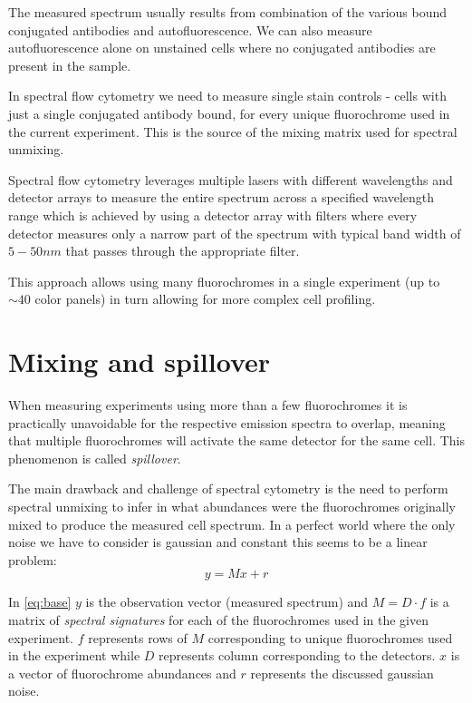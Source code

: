 The measured spectrum usually results from combination of the various bound conjugated antibodies and autofluorescence. We can also measure autofluorescence alone on unstained cells where no conjugated antibodies are present in the sample. 

In spectral flow cytometry we need to measure single stain controls - cells with just a single conjugated antibody bound, for every unique fluorochrome used in the current experiment. This is the source of the mixing matrix used for spectral unmixing\cite{mixmat}. 

Spectral flow cytometry leverages multiple lasers with different wavelengths and detector arrays to measure the entire spectrum across a specified wavelength range which is achieved by using a detector array with filters where every detector measures only a narrow part of the spectrum with typical band width of $5-50nm$ that passes through the appropriate filter.\cite{ctyoovw} 

This approach allows using many fluorochromes in a single experiment (up to $\sim 40$  color panels) in turn allowing for more complex cell profiling\cite{40OMIP2020}.

\section{Mixing and spillover}
\label{subs:mixing}

When measuring experiments using more than a few fluorochromes it is practically unavoidable for the respective emission spectra to overlap, meaning that multiple fluorochromes will activate the same detector for the same cell. This phenomenon is called \emph{spillover}.

The main drawback and challenge of spectral cytometry is the need to perform spectral unmixing to infer in what abundances were the fluorochromes originally mixed to produce the measured cell spectrum\cite{unmix2013nonsq}.
In a perfect world where the only noise we have to consider is gaussian and constant this seems to be a linear problem:
\begin{equation}
 y=Mx+r
 \label{eq:base}
\end{equation}

In \cref{eq:base} $y$ is the observation vector (measured spectrum) and $M=D \cdot f$ is a matrix of \emph{spectral signatures} for each of the fluorochromes used in the given experiment. $f$ represents rows of $M$ corresponding to unique fluorochromes used in the experiment while $D$ represents column corresponding to the detectors. $x$ is a vector of fluorochrome abundances and $r$ represents the discussed gaussian noise.\cite{unmix2013nonsq}

